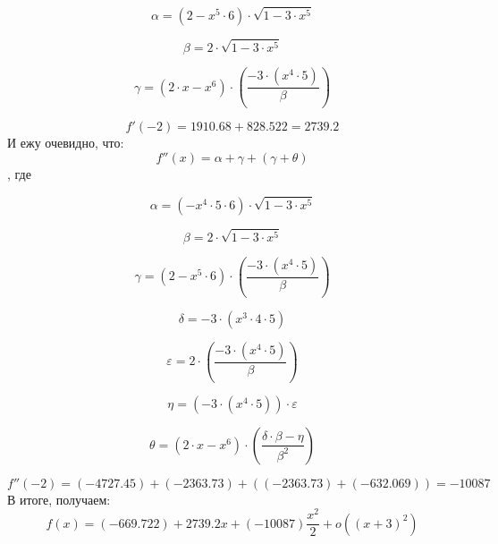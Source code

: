 \documentclass[12pt,a4paper,fleqn]{article}
\begin{document}
$$
\alpha = \left(2- x^{5}\cdot6\right)\cdot\sqrt{1-3\cdot x^{5}}
$$

$$
\beta = 2\cdot\sqrt{1-3\cdot x^{5}}
$$

$$
\gamma = \left(2\cdot x- x^{6}\right)\cdot\left(\frac{-3\cdot\left( x^{4}\cdot5\right)}{ \beta}\right)
$$

$$
f'(-2)=1910.68+828.522=2739.2
$$
И ежу очевидно, что:
$$
f''(x)= \alpha+ \gamma+\left( \gamma+ \theta\right)
$$
, где

$$
\alpha = \left(- x^{4}\cdot5\cdot6\right)\cdot\sqrt{1-3\cdot x^{5}}
$$

$$
\beta = 2\cdot\sqrt{1-3\cdot x^{5}}
$$

$$
\gamma = \left(2- x^{5}\cdot6\right)\cdot\left(\frac{-3\cdot\left( x^{4}\cdot5\right)}{ \beta}\right)
$$

$$
\delta = -3\cdot\left( x^{3}\cdot4\cdot5\right)
$$

$$
\varepsilon = 2\cdot\left(\frac{-3\cdot\left( x^{4}\cdot5\right)}{ \beta}\right)
$$

$$
\eta = \left(-3\cdot\left( x^{4}\cdot5\right)\right)\cdot \varepsilon
$$

$$
\theta = \left(2\cdot x- x^{6}\right)\cdot\left(\frac{ \delta\cdot \beta- \eta}{ \beta^{2}}\right)
$$

$$
f''(-2)=(-4727.45)+(-2363.73)+\left((-2363.73)+(-632.069)\right)=-10087
$$
В итоге, получаем:
$$
f(x)=(-669.722)+2739.2x+(-10087)\frac{x^2}{2}+o((x+3)^{2})
$$
\end{document}
